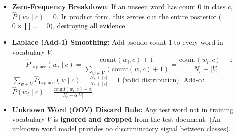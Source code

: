 \documentclass[10pt,a4paper]{article}
\begin{document}
\vspace{-2pt}

\par\vspace{1pt}
\begin{itemize}[leftmargin=12pt, itemsep=0.5pt, parsep=0pt, topsep=0.5pt]
    \item \textbf{Zero-Frequency Breakdown:} If an unseen word has count 0 in class $c$, $\hat{P}(w_i \mid c) = 0$. In product form, this zeroes out the entire posterior ($0 \times \prod \dots = 0$), destroying all evidence.
    \item \textbf{Laplace (Add-1) Smoothing:} Add pseudo-count 1 to every word in vocabulary $V$:
    \[
    \hat{P}_{\text{Laplace}}(w_i \mid c) = \frac{\text{count}(w_i, c) + 1}{\sum_{w \in V} (\text{count}(w, c) + 1)} = \frac{\text{count}(w_i, c) + 1}{N_c + |V|}
    \]
    $\sum_{w \in V} \hat{P}_{\text{Laplace}}(w \mid c) = \frac{N_c + |V|}{N_c + |V|} = 1$ (valid distribution). Add-$\alpha$: $\hat{P}(w_i \mid c) = \frac{\text{count}(w_i, c) + \alpha}{N_c + \alpha |V|}$.
    \item \textbf{Unknown Word (OOV) Discard Rule:} Any test word not in training vocabulary $V$ is \textbf{ignored and dropped} from the test document. (An unknown word model provides no discriminatory signal between classes).
\end{itemize}

\vspace{-2pt}
\end{document}
